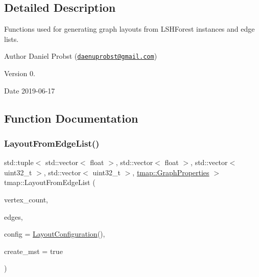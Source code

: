 \subsection{Detailed Description}
Functions used for generating graph layouts from L\+S\+H\+Forest instances and edge lists. 

\begin{DoxyAuthor}{Author}
Daniel Probst (\href{mailto:daenuprobst@gmail.com}{\tt daenuprobst@gmail.\+com}) 
\end{DoxyAuthor}
\begin{DoxyVersion}{Version}
0. 
\end{DoxyVersion}
\begin{DoxyDate}{Date}
2019-\/06-\/17 
\end{DoxyDate}


\subsection{Function Documentation}
\mbox{\label{layout_8hh_file_a780993ad8dd7e349b77f55895cc33451}} 
\subsubsection{\texorpdfstring{Layout\+From\+Edge\+List()}{LayoutFromEdgeList()}}
{\footnotesize\ttfamily std\+::tuple$<$ std\+::vector$<$ float $>$, std\+::vector$<$ float $>$, std\+::vector$<$ uint32\+\_\+t $>$, std\+::vector$<$ uint32\+\_\+t $>$, \hyperlink{structtmap_1_1GraphProperties}{tmap\+::\+Graph\+Properties} $>$ tmap\+::\+Layout\+From\+Edge\+List (\begin{DoxyParamCaption}\item[{uint32\+\_\+t}]{vertex\+\_\+count,  }\item[{const std\+::vector$<$ std\+::tuple$<$ uint32\+\_\+t, uint32\+\_\+t, float $>$$>$ \&}]{edges,  }\item[{\hyperlink{structtmap_1_1LayoutConfiguration}{tmap\+::\+Layout\+Configuration}}]{config = {\ttfamily \hyperlink{structtmap_1_1LayoutConfiguration}{Layout\+Configuration}()},  }\item[{bool}]{create\+\_\+mst = {\ttfamily true} }\end{DoxyParamCaption})}



